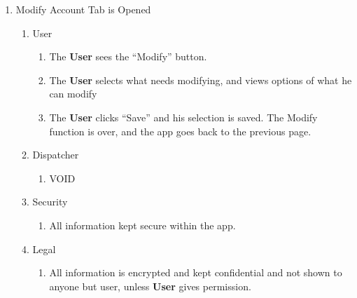 \documentclass[english]{article}
\begin{document}
\begin{enumerate}[{BE}1.]
	\item Modify Account Tab is Opened	
	\begin{enumerate}[{VP4}.1]
		\item User
			\begin{enumerate}
				\item The \textbf{User} sees the “Modify” button.
				\item The \textbf{User} selects what needs modifying, and views options of what he can modify
				\item The \textbf{User} clicks “Save” and his selection is saved. The Modify function is over, and the app goes back to the previous page.
			\end{enumerate}
		\item Dispatcher
			\begin{enumerate}
				\item VOID
			\end{enumerate}
		\item Security
			\begin{enumerate}
				\item All information kept secure within the app.
			\end{enumerate}
		\item Legal
			\begin{enumerate}
				\item All information is encrypted and kept confidential and not shown to anyone but user, unless \textbf{User} gives permission.
			\end{enumerate}
	\end{enumerate}


\end{enumerate}
\end{document}
